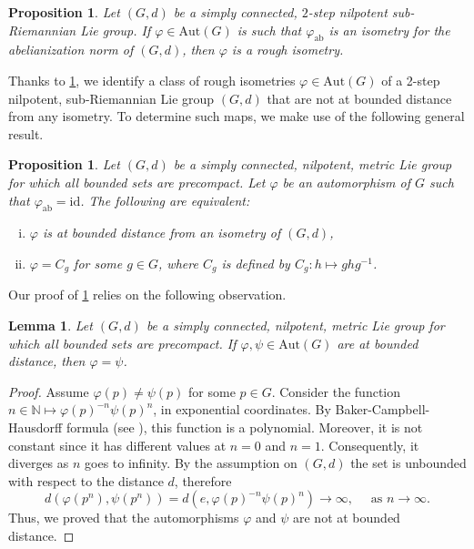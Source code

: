 \documentclass[a4paper,11pt,reqno]{amsart}
\theoremstyle{plain}
\newtheorem{lemma}[theorem]{Lemma}
\newtheorem{proposition}[theorem]{Proposition}
\theoremstyle{definition}
\newcommand{\N}{\mathbb N}
\newcommand{\vphi}{\varphi}
\newcommand{\id}{e}
\begin{document}
 \begin{proposition} \label{many quasi isometries}
 Let $(G,d)$ be a simply connected, $2$-step nilpotent sub-Riemannian Lie group. If $\vphi \in \mathrm{Aut}(G)$ is such that $\vphi_\mathrm{ab}$ is an isometry for the abelianization norm of $(G,d)$, then $\vphi$ is a rough isometry. 
\end{proposition}

Thanks to \cref{many quasi isometries}, we identify a class of rough isometries $\vphi \in \mathrm{Aut}(G)$ of a 2-step nilpotent, sub-Riemannian Lie group $(G,d)$ that are not at bounded distance from any isometry. To determine such maps, we make use of the following general result.

\begin{proposition} \label{bounded iso}
 Let $(G,d)$ be a simply connected, nilpotent, metric Lie group for which all bounded sets are precompact. Let $\vphi$ be an automorphism of $G$ such that $\vphi_\mathrm{ab}=\mathrm{id}$. The following are equivalent:
 \begin{enumerate}[(i)]
 \item $\vphi$ is at bounded distance from an isometry of $(G,d)$,
 \item $\vphi=C_g$ for some $g \in G$, where $C_g$ is defined by $C_g \colon h \mapsto ghg^{-1}$.
 \end{enumerate}
\end{proposition}

Our proof of \cref{bounded iso} relies on the following observation.

\begin{lemma} \label{bounded auto}
 Let $(G,d)$ be a simply connected, nilpotent, metric Lie group for which all bounded sets are precompact. If $\vphi, \psi \in \mathrm{Aut}(G)$ are at bounded distance, then $\vphi = \psi$.
\end{lemma}

\begin{proof}
 Assume $\vphi(p) \neq \psi(p)$ for some $p \in G$. 
 Consider the function $n\in \N \mapsto \vphi(p)^{-n}\psi(p)^n$, in exponential coordinates. By Baker-Campbell-Hausdorff formula (see \cite[Theorem~11.2.6]{hilgert2011structure}), 
 this function is a polynomial. Moreover, it is not constant since it has different values at $n=0$ and $n=1$.
 Consequently, it diverges as $n$ goes to infinity.
 By the assumption on $(G,d)$ the set is unbounded with respect to the distance $d$, therefore 
 \begin{equation*}
 d(\vphi(p^n),\psi(p^n)) = d( \id , \vphi(p)^{-n}\psi(p)^n) \to \infty, \quad \text{ as $n \to \infty$.}
 \end{equation*}
 Thus, we proved that the automorphisms $\vphi$ and $\psi$ are not at bounded distance.
\end{proof}
\end{document}
